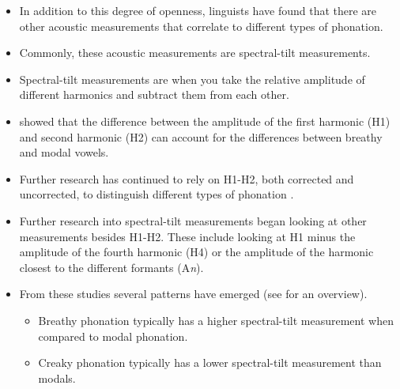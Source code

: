 \documentclass[12pt, letterpaper]{article}
\begin{document}
\begin{itemize}
	\item In addition to this degree of openness, linguists have found that there are other acoustic measurements that correlate to different types of phonation. 
	\item Commonly, these acoustic measurements are spectral-tilt measurements. 
	\item Spectral-tilt measurements are when you take the relative amplitude of different harmonics and subtract them from each other. 
	\item \cite{fischer-jorgensenPhoneticAnalysisBreathy1968} showed that the difference between the amplitude of the first harmonic (H1) and second harmonic (H2) can account for the differences between breathy and modal vowels.
	\item Further research has continued to rely on H1-H2, both corrected and uncorrected, to distinguish different types of phonation \citep[e.g.,][]{huffmanMeasuresPhonationType1987,klattAnalysisSynthesisPerception1990}. 
	\item Further research into spectral-tilt measurements began looking at other measurements besides H1-H2. These include looking at H1 minus the amplitude of the fourth harmonic (H4) or the amplitude of the harmonic closest to the different formants (A\textit{n}). 
	\item From these studies several patterns have emerged (see \cite{garellekPhoneticsVoice2019} for an overview). 
	\begin{itemize}
		\item Breathy phonation typically has a higher spectral-tilt measurement when compared to modal phonation. 
		\item Creaky phonation typically has a lower spectral-tilt measurement than modals. 
	\end{itemize} 
\end{itemize}
\end{document}
